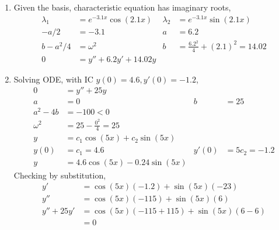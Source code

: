 \begin{enumerate}
    \item Given the basis, characteristic equation has imaginary roots,
          \begin{align}
              \lambda_{1} & = e^{-3.1x}\cos(2.1 x)                    &
              \lambda_{2} & = e^{-3.1x}\sin(2.1 x)                      \\
              -a/2        & = -3.1                                    &
              a           & = 6.2                                       \\
              b - a^{2}/4 & = \omega ^{2}                             &
              b           & =   \frac{6.2^{2}}{4} + (2.1)^{2} = 14.02   \\
              0           & = y'' + 6.2y' + 14.02y
          \end{align}

    \item Solving ODE, with IC $ y(0) = 4.6, y'(0) = -1.2 $,
          \begin{align}
              0          & = y'' + 25y                       \\
              a          & = 0                             &
              b          & = 25                              \\
              a^{2} - 4b & = -100  < 0                       \\
              \omega^{2} & = 25 - \frac{0^{2}}{4} = 25       \\
              y          & = c_{1}\cos(5x) + c_{2}\sin(5x)   \\
              y(0)       & = c_{1} = 4.6                   &
              y'(0)      & = 5c_{2} = -1.2                   \\
              y          & = 4.6 \cos(5x) - 0.24 \sin(5x)
          \end{align}
          Checking by substitution,
          \begin{align}
              y'         & = \cos(5 x) (- 1.2) + \sin(5 x)(-23)       \\
              y''        & = \cos(5 x)(-115) + \sin(5 x)(6)           \\
              y'' + 25y' & = \cos(5 x)(-115 + 115) + \sin(5 x)(6 - 6) \\
                         & = 0
          \end{align}


\end{enumerate}

